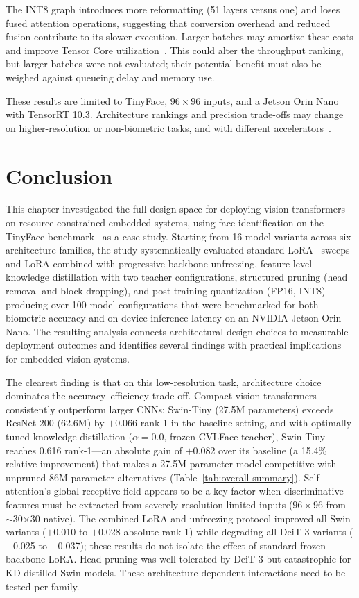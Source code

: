 \documentclass[runningheads,a4paper]{llncs}
\begin{document}
The INT8 graph introduces more reformatting (51 layers versus one) and loses fused attention operations, suggesting that conversion overhead and reduced fusion contribute to its slower execution. Larger batches may amortize these costs and improve Tensor Core utilization~\cite{NVIDIATensorRTBatching}. This could alter the throughput ranking, but larger batches were not evaluated; their potential benefit must also be weighed against queueing delay and memory use.

These results are limited to TinyFace, $96\times96$ inputs, and a Jetson Orin Nano with TensorRT 10.3. Architecture rankings and precision trade-offs may change on higher-resolution or non-biometric tasks, and with different accelerators~\cite{Ngo2025EdgeInference}.

\section{Conclusion}

This chapter investigated the full design space for deploying vision transformers on resource-constrained embedded systems, using face identification on the TinyFace benchmark~\cite{cheng2018lowresface} as a case study. Starting from 16 model variants across six architecture families, the study systematically evaluated standard LoRA~\cite{hu2022lora} sweeps and LoRA combined with progressive backbone unfreezing, feature-level knowledge distillation with two teacher configurations, structured pruning (head removal and block dropping), and post-training quantization (FP16, INT8)---producing over 100 model configurations that were benchmarked for both biometric accuracy and on-device inference latency on an NVIDIA Jetson Orin Nano. The resulting analysis connects architectural design choices to measurable deployment outcomes and identifies several findings with practical implications for embedded vision systems.

The clearest finding is that on this low-resolution task, architecture choice dominates the accuracy--efficiency trade-off. Compact vision transformers consistently outperform larger CNNs: Swin-Tiny (27.5M parameters) exceeds ResNet-200 (62.6M) by $+$0.066 rank-1 in the baseline setting, and with optimally tuned knowledge distillation ($\alpha = 0.0$, frozen CVLFace teacher), Swin-Tiny reaches 0.616 rank-1---an absolute gain of $+$0.082 over its baseline (a 15.4\% relative improvement) that makes a 27.5M-parameter model competitive with unpruned 86M-parameter alternatives (Table~\ref{tab:overall-summary}). Self-attention's global receptive field appears to be a key factor when discriminative features must be extracted from severely resolution-limited inputs ($96\times96$ from $\sim$30$\times$30 native). The combined LoRA-and-unfreezing protocol improved all Swin variants ($+$0.010 to $+$0.028 absolute rank-1) while degrading all DeiT-3 variants ($-$0.025 to $-$0.037); these results do not isolate the effect of standard frozen-backbone LoRA. Head pruning was well-tolerated by DeiT-3 but catastrophic for KD-distilled Swin models. These architecture-dependent interactions need to be tested per family.
\end{document}
